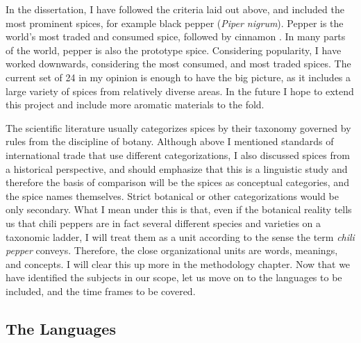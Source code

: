 
In the dissertation, I have followed the criteria laid out above, and included the most prominent spices, for example black pepper (\textit{Piper nigrum}). Pepper is the world's most traded and consumed spice, followed by cinnamon \autocite[16]{senaratne_cinnamon_2020}. In many parts of the world, pepper is also the prototype spice. Considering popularity, I have worked downwards, considering the most consumed, and most traded spices. The current set of 24 in my opinion is enough to have the big picture, as it includes a large variety of spices from relatively diverse areas. In the future I hope to extend this project and include more aromatic materials to the fold.

The scientific literature usually categorizes spices by their taxonomy governed by rules from the discipline of botany. Although above I mentioned standards of international trade that use different categorizations, I also discussed spices from a historical perspective, and should emphasize that this is a linguistic study and therefore the basis of comparison will be the spices as conceptual categories, and the spice names themselves. Strict botanical or other categorizations would be only secondary. What I mean under this is that, even if the botanical reality tells us that chili peppers are in fact several different species and varieties on a taxonomic ladder, I will treat them as a unit according to the sense the term \textit{chili pepper} conveys. Therefore, the close organizational units are words, meanings, and concepts. I will clear this up more in the methodology chapter. Now that we have identified the subjects in our scope, let us move on to the languages to be included, and the time frames to be covered.


\subsection{The Languages}

